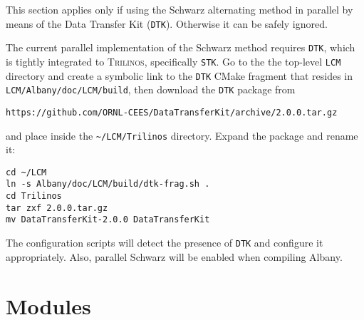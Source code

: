\documentclass{article}
\newcommand{\trilinos}{\textsc{Trilinos}}
\begin{document}
This section applies only if using the Schwarz alternating method in parallel by
means of the Data Transfer Kit (\verb+DTK+).  Otherwise it can be safely
ignored.

The current parallel implementation of the Schwarz method requires \verb+DTK+,
which is tightly integrated to \trilinos{}, specifically \verb+STK+. Go to the
the top-level \verb+LCM+ directory and create a symbolic link to the \verb+DTK+
CMake fragment that resides in \verb+LCM/Albany/doc/LCM/build+, then download
the \verb+DTK+ package from

\begin{verbatim}
https://github.com/ORNL-CEES/DataTransferKit/archive/2.0.0.tar.gz
\end{verbatim}

\noindent
and place inside the \verb+~/LCM/Trilinos+ directory. Expand the package and
rename it:
\begin{verbatim}
cd ~/LCM
ln -s Albany/doc/LCM/build/dtk-frag.sh .
cd Trilinos
tar zxf 2.0.0.tar.gz
mv DataTransferKit-2.0.0 DataTransferKit
\end{verbatim}
The configuration scripts will detect the presence of \verb+DTK+ and
configure it appropriately. Also, parallel Schwarz will be enabled when
compiling Albany.

\section{Modules}
\label{sec:modules}
\end{document}
